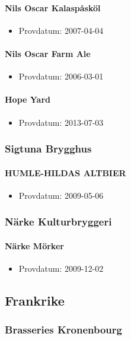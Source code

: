 \documentclass[11pt]{article}
\begin{document}
\paragraph{Nils Oscar Kalaspåsköl}
\label{sec:org488fa51}
\begin{itemize}
\item Provdatum: 2007-04-04
\end{itemize}
\paragraph{Nils Oscar Farm Ale}
\label{sec:orgb7dcd17}
\begin{itemize}
\item Provdatum: 2006-03-01
\end{itemize}
\paragraph{Hope Yard}
\label{sec:orgfd9bd83}
\begin{itemize}
\item Provdatum: 2013-07-03
\end{itemize}
\subsubsection{Sigtuna Brygghus}
\label{sec:org18ec341}
\paragraph{HUMLE-HILDAS ALTBIER}
\label{sec:org8a1e805}
\begin{itemize}
\item Provdatum: 2009-05-06
\end{itemize}
\subsubsection{Närke Kulturbryggeri}
\label{sec:orgb1c1143}
\paragraph{Närke Mörker}
\label{sec:orgc5f7dba}
\begin{itemize}
\item Provdatum: 2009-12-02
\end{itemize}
\subsection{Frankrike}
\label{sec:org18752c1}
\subsubsection{Brasseries Kronenbourg}
\label{sec:orgef5c8d6}
\end{document}
